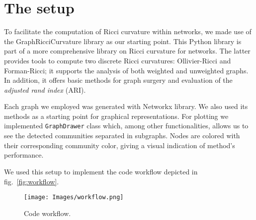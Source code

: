 \section{The setup}\label{sec5.1}
To facilitate the computation of Ricci curvature within networks, we made use of the GraphRicciCurvature library as our starting point. This Python library is part of a more comprehensive library on Ricci curvature for networks. The latter provides tools to compute two discrete Ricci curvatures: Ollivier-Ricci and Forman-Ricci; it supports the analysis of both weighted and unweighted graphs. In addition, it offers basic methods for graph surgery and evaluation of the \textit{adjusted rand index} (ARI).

Each graph we employed was generated with Networkx library. We also used its methods as a starting point for graphical representations.
For plotting we implemented \texttt{GraphDrawer} class which, among other functionalities, allows us to see the detected communities separated in subgraphs. Nodes are colored with their corresponding community color, giving a visual indication of method's performance. 

We used this setup to implement the code workflow depicted in fig.~\ref{fig:workflow}.

\begin{figure}
    \centering
    \texttt{[image: Images/workflow.png]}
    \caption{Code workflow.}
\end{figure}\label{fig:workflow}
